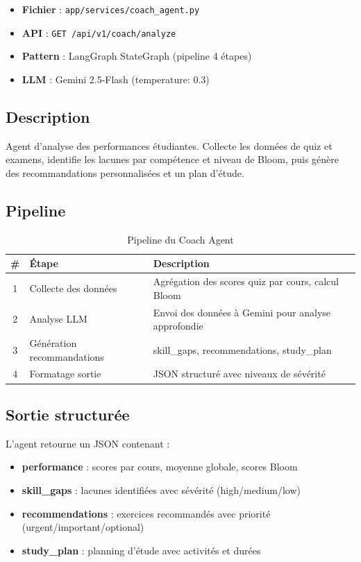 \documentclass[12pt,a4paper]{article}
\begin{document}
\begin{itemize}[leftmargin=*]
    \item \textbf{Fichier} : \texttt{app/services/coach\_agent.py}
    \item \textbf{API} : \texttt{GET /api/v1/coach/analyze}
    \item \textbf{Pattern} : LangGraph StateGraph (pipeline 4 étapes)
    \item \textbf{LLM} : Gemini 2.5-Flash (temperature: 0.3)
\end{itemize}

\subsection{Description}
Agent d'analyse des performances étudiantes. Collecte les données de quiz et examens, identifie les lacunes par compétence et niveau de Bloom, puis génère des recommandations personnalisées et un plan d'étude.

\subsection{Pipeline}

\begin{table}[h!]
\centering
\begin{tabular}{@{}clp{8cm}@{}}
\toprule
\textbf{\#} & \textbf{Étape} & \textbf{Description} \\
\midrule
1 & Collecte des données & Agrégation des scores quiz par cours, calcul Bloom \\
2 & Analyse LLM & Envoi des données à Gemini pour analyse approfondie \\
3 & Génération recommandations & skill\_gaps, recommendations, study\_plan \\
4 & Formatage sortie & JSON structuré avec niveaux de sévérité \\
\bottomrule
\end{tabular}
\caption{Pipeline du Coach Agent}
\end{table}

\subsection{Sortie structurée}
L'agent retourne un JSON contenant :
\begin{itemize}
    \item \textbf{performance} : scores par cours, moyenne globale, scores Bloom
    \item \textbf{skill\_gaps} : lacunes identifiées avec sévérité (high/medium/low)
    \item \textbf{recommendations} : exercices recommandés avec priorité (urgent/important/optional)
    \item \textbf{study\_plan} : planning d'étude avec activités et durées
\end{itemize}
\end{document}
